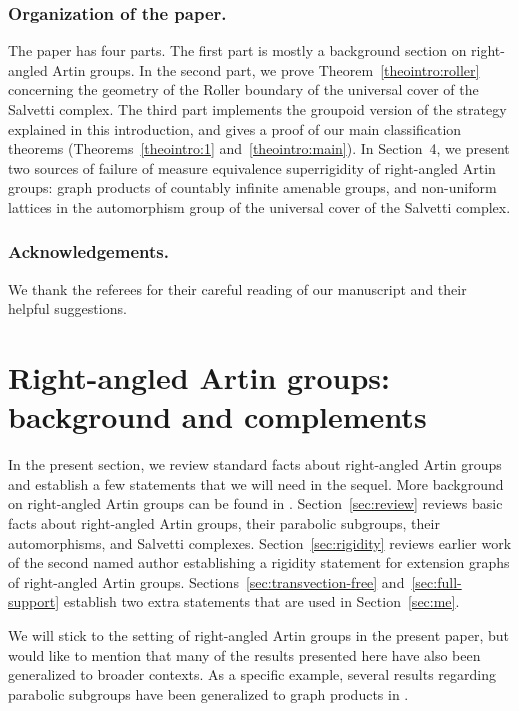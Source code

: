 \documentclass[JEP,XML,SOM,Unicode,NoFloatCountersInSection,published]{cedram}
\theoremstyle{plain}
\theoremstyle{definition}
\begin{document}
\subsubsection*{Organization of the paper.}

The paper has four parts. The first part is mostly a background section on right-angled Artin groups. In the second part, we prove Theorem~\ref{theointro:roller} concerning the geometry of the Roller boundary of the universal cover of the Salvetti complex. The third part implements the groupoid version of the strategy explained in this introduction, and gives a proof of our main classification theorems (Theorems~\ref{theointro:1} and~\ref{theointro:main}). In Section~4, we present two sources of failure of measure equivalence superrigidity of right-angled Artin groups: graph products of countably infinite amenable groups, and non-uniform lattices in the automorphism group of the universal cover of the Salvetti complex.

\subsubsection*{Acknowledgements.}
We thank the referees for their careful reading of our manuscript and their helpful suggestions.

\section{Right-angled Artin groups: background and complements}

In the present section, we review standard facts about right-angled Artin groups and establish a few statements that we will need in the sequel. More background on right-angled Artin groups can be found in \cite{charney2007introduction}. Section~\ref{sec:review} reviews basic facts about right-angled Artin groups, their parabolic subgroups, their automorphisms, and Salvetti complexes. Section~\ref{sec:rigidity} reviews earlier work of the second named author \cite{Hua} establishing a rigidity statement for extension graphs of right-angled Artin groups. Sections~\ref{sec:transvection-free} and~\ref{sec:full-support} establish two extra statements that are used in Section~\ref{sec:me}.

We will stick to the setting of right-angled Artin groups in the present paper, but would like to mention that many of the results presented here have also been generalized to broader contexts. As a specific example, several results regarding parabolic subgroups have been generalized to graph products in \cite[\S 3]{antolin2015tits}.
\end{document}
